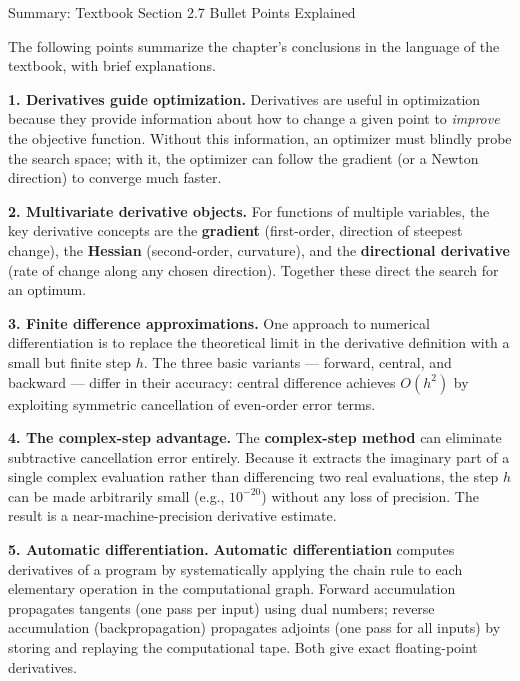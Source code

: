 \documentclass[aspectratio=169,10pt]{beamer}
\begin{document}
\begin{frame}[allowframebreaks]{Summary: Textbook Section 2.7 Bullet Points Explained}

  The following points summarize the chapter's conclusions in the language
  of the textbook, with brief explanations.

  \medskip
  \textbf{1. Derivatives guide optimization.}
  Derivatives are useful in optimization because they provide information
  about how to change a given point to \emph{improve} the objective
  function.  Without this information, an optimizer must blindly probe
  the search space; with it, the optimizer can follow the gradient (or
  a Newton direction) to converge much faster.

  \medskip
  \textbf{2. Multivariate derivative objects.}
  For functions of multiple variables, the key derivative concepts are the
  \textbf{gradient} (first-order, direction of steepest change), the
  \textbf{Hessian} (second-order, curvature), and the
  \textbf{directional derivative} (rate of change along any chosen
  direction).  Together these direct the search for an optimum.

  \medskip
  \textbf{3. Finite difference approximations.}
  One approach to numerical differentiation is to replace the theoretical
  limit in the derivative definition with a small but finite step $h$.
  The three basic variants --- forward, central, and backward --- differ
  in their accuracy: central difference achieves $O(h^2)$ by exploiting
  symmetric cancellation of even-order error terms.

  \framebreak

  \textbf{4. The complex-step advantage.}
  The \textbf{complex-step method} can eliminate subtractive cancellation
  error entirely.  Because it extracts the imaginary part of a single
  complex evaluation rather than differencing two real evaluations, the
  step $h$ can be made arbitrarily small (e.g., $10^{-20}$) without any
  loss of precision.  The result is a near-machine-precision derivative
  estimate.

  \medskip
  \textbf{5. Automatic differentiation.}
  \textbf{Automatic differentiation} computes derivatives of a program
  by systematically applying the chain rule to each elementary operation
  in the computational graph.  Forward accumulation propagates tangents
  (one pass per input) using dual numbers; reverse accumulation
  (backpropagation) propagates adjoints (one pass for all inputs) by
  storing and replaying the computational tape.  Both give exact
  floating-point derivatives.


\end{frame}
\end{document}
